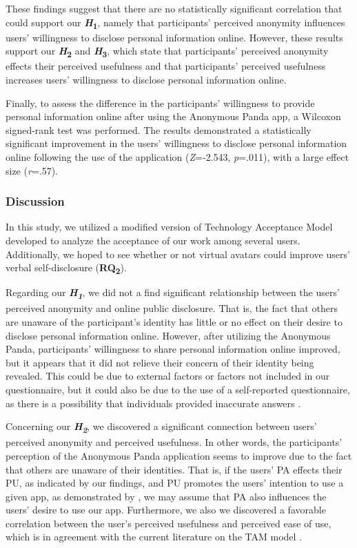 These findings suggest that there are no statistically significant correlation that could support our \textbf{\textit{H}\textsubscript{1}}, namely that participants' perceived anonymity influences users' willingness to disclose personal information online. However, these results support our \textbf{\textit{H}\textsubscript{2}} and \textbf{\textit{H}\textsubscript{3}}, which state that participants' perceived anonymity effects their perceived usefulness and that participants' perceived usefulness increases users' willingness to disclose personal information online.

Finally, to assess the difference in the participants' willingness to provide personal information online after using the Anonymous Panda app, a Wilcoxon signed-rank test was performed. The results demonstrated a statistically significant improvement in the users' willingness to disclose personal information online following the use of the application (\textit{Z}=-2.543, \textit{p}=.011), with a large effect size (\textit{r}=.57).
 
\subsubsection{Discussion}
In this study, we utilized a modified version of Technology Acceptance Model developed to analyze the acceptance of our work among several users. Additionally, we hoped to see whether or not virtual avatars could improve users' verbal self-disclosure (\textbf{RQ\textsubscript{2}}).

Regarding our \textbf{\textit{H\textsubscript{1}}}, we did not a find significant relationship between the users' perceived anonymity and online public disclosure. That is, the fact that others are unaware of the participant's identity has little or no effect on their desire to disclose personal information online. However, after utilizing the Anonymous Panda, participants' willingness to share personal information online improved, but it appears that it did not relieve their concern of their identity being revealed. This could be due to external factors or factors not included in our questionnaire, but it could also be due to the use of a self-reported questionnaire, as there is a possibility that individuals provided inaccurate answers \cite{DEM15}.

Concerning our \textbf{\textit{H\textsubscript{2}}}, we discovered a significant connection between users' perceived anonymity and perceived usefulness. In other words, the participants' perception of the Anonymous Panda application seems to improve due to the fact that others are unaware of their identities. That is, if the users' PA effects their PU, as indicated by our findings, and PU promotes the users' intention to use a given app, as demonstrated by \cite{DAV89}, we may assume that PA also influences the users' desire to use our app. Furthermore, we also we discovered a favorable correlation between the user's perceived usefulness and perceived ease of use, which is in agreement with the current literature on the TAM model \cite{DAV89}.

